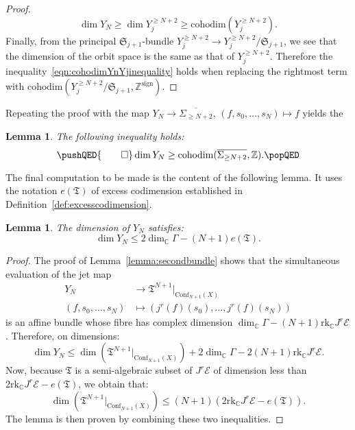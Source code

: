 \documentclass[a4paper]{amsart}
\newcommand{\bZ}{\mathbb Z}
\newcommand{\bC}{\mathbb C}
\newcommand{\cE}{\mathcal E}
\newcommand{\fT}{\mathfrak T}
\newcommand{\lra}{\longrightarrow}
\newcommand{\fS}{\mathfrak S}
\theoremstyle{plain}
\newtheorem{lemma}[theorem]{Lemma}
\theoremstyle{definition}
\newcommand{\Conf}{\mathrm{Conf}}
\newcommand{\rank}{\mathrm{rk}}
\newcommand{\cohodim}{\mathrm{cohodim}}
\begin{document}
\begin{proof}
\begin{equation}\label{eqn:cohodimYnYjinequality}
    \dim Y_N \geq \dim Y_j^{\geq N+2} \geq \cohodim\left(Y_j^{\geq N+2}\right).
\end{equation}
Finally, from the principal $\fS_{j+1}$-bundle $Y_j^{\geq N+2} \to Y_j^{\geq N+2} / \fS_{j+1}$, we see that the dimension of the orbit space is the same as that of $Y_j^{\geq N+2}$. Therefore the inequality~\eqref{eqn:cohodimYnYjinequality} holds when replacing the rightmost term with $\cohodim(Y_j^{\geq N+2} / \fS_{j+1}, \bZ^\mathrm{sign})$.
\end{proof}

\noindent Repeating the proof with the map $Y_N \to \overline{\Sigma_{\geq N+2}}$, $(f,s_0,\ldots,s_N) \mapsto f$ yields the
\begin{lemma}\label{lemma:estimationcohodimapexofcone}
The following inequality holds:
\[
\pushQED{\qed} 
    \dim Y_N \geq \cohodim(\overline{\Sigma_{\geq N+2}}, \bZ). \qedhere
\popQED
\]
\end{lemma}

\noindent The final computation to be made is the content of the following lemma. It uses the notation $e(\fT)$ of excess codimension established in Definition~\ref{def:excesscodimension}.
\begin{lemma}\label{lemma:YNcohodimestimation}
The dimension of $Y_N$ satisfies:
\[
    \dim Y_N \leq 2 \dim_\bC \Gamma - (N+1)e(\fT).
\]
\end{lemma}
\begin{proof}
The proof of Lemma~\ref{lemma:secondbundle} shows that the simultaneous evaluation of the jet map
\begin{align*}
    Y_N &\lra \fT^{N+1}|_{\Conf_{N+1}(X)} \\
    (f,s_0,\ldots,s_N) &\longmapsto (j^r(f)(s_0), \ldots, j^r(f)(s_N))
\end{align*}
is an affine bundle whose fibre has complex dimension $\dim_\bC \Gamma- (N+1)\rank_\bC J^r\cE$. Therefore, on dimensions:
\[
    \dim Y_N \leq \dim(\fT^{N+1}|_{\Conf_{N+1}(X)}) + 2\dim_\bC \Gamma - 2(N+1)\rank_\bC J^r\cE.
\]
Now, because $\fT$ is a semi-algebraic subset of $J^r\cE$ of dimension less than $2\rank_\bC J^r\cE - e(\fT)$, we obtain that:
\[
    \dim(\fT^{N+1}|_{\Conf_{N+1}(X)}) \leq (N+1)(2\rank_\bC J^r\cE - e(\fT)).
\]
The lemma is then proven by combining these two inequalities.
\end{proof}
\end{document}
